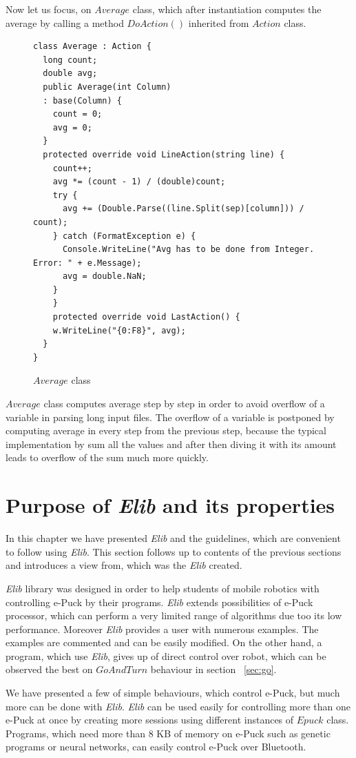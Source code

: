   Now let us focus, on $Average$ class, which after instantiation computes the average by calling a method $DoAction()$
  inherited from $Action$ class. 

\begin{figure}[!hbp]
\begin{lstlisting}
class Average : Action {
  long count;
  double avg;
  public Average(int Column)
  : base(Column) {
    count = 0;
    avg = 0;
  }
  protected override void LineAction(string line) {
    count++;
    avg *= (count - 1) / (double)count;
    try {
      avg += (Double.Parse((line.Split(sep)[column])) / count);
    } catch (FormatException e) {
      Console.WriteLine("Avg has to be done from Integer. Error: " + e.Message);
      avg = double.NaN;
    }
    }
    protected override void LastAction() {
    w.WriteLine("{0:F8}", avg);
  }
}
\end{lstlisting}
\caption{$Average$ class}\label{average}
\end{figure}

  $Average$ class computes average step by step in order to avoid 
  overflow of a variable in parsing long input files. The overflow
  of a variable is postponed by computing average in every step from the previous step, 
  because the typical implementation by sum all the values and after then diving it 
  with its amount leads to overflow of the sum much more quickly.

\section{Purpose of {\it Elib} and its properties}
  In this chapter we have presented {\it Elib} and the guidelines, which are convenient to follow using {\it Elib}. 
  This section follows up to contents of the previous sections and introduces a view from,
  which was the {\it Elib} created.

  {\it Elib} library was designed in order to help students of mobile robotics	with controlling e-Puck by their programs.
  {\it Elib} extends possibilities of e-Puck processor, which can perform a very limited range of algorithms
  due too its low performance.
  Moreover {\it Elib} provides a user with numerous examples. The examples are commented
  and can be easily modified.
  On the other hand, a program, which use {\it Elib}, gives up of direct control over robot,
  which can be observed the best on $GoAndTurn$ behaviour in section ~\ref{sec:go}.

  We have presented a few of simple behaviours, which control e-Puck, but much more can be done with {\it Elib}.
  {\it Elib} can be used easily for controlling more than one e-Puck at once by creating more sessions using
  different instances of $Epuck$ class. Programs, which need more than 8 KB of memory on e-Puck such 
  as genetic programs or neural networks, can easily control e-Puck over Bluetooth.

